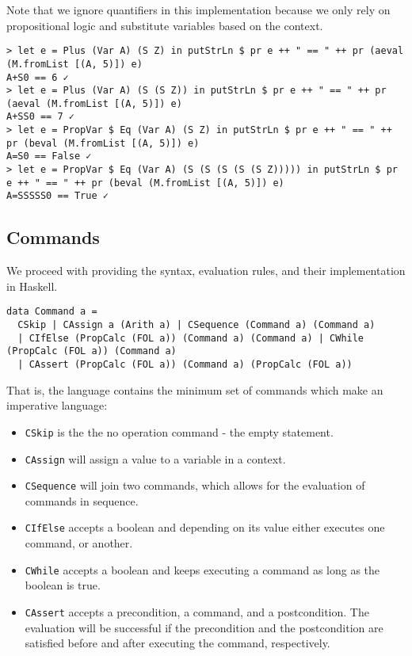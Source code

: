 \documentclass{article}
\begin{document}
Note that we ignore quantifiers in this implementation because we only rely on propositional logic and substitute variables based on the context.

\begin{lstlisting}
> let e = Plus (Var A) (S Z) in putStrLn $ pr e ++ " == " ++ pr (aeval (M.fromList [(A, 5)]) e)
A+S0 == 6 ✓
> let e = Plus (Var A) (S (S Z)) in putStrLn $ pr e ++ " == " ++ pr (aeval (M.fromList [(A, 5)]) e)
A+SS0 == 7 ✓
> let e = PropVar $ Eq (Var A) (S Z) in putStrLn $ pr e ++ " == " ++ pr (beval (M.fromList [(A, 5)]) e)
A=S0 == False ✓
> let e = PropVar $ Eq (Var A) (S (S (S (S (S Z))))) in putStrLn $ pr e ++ " == " ++ pr (beval (M.fromList [(A, 5)]) e)
A=SSSSS0 == True ✓
\end{lstlisting}

\subsection{Commands}

We proceed with providing the syntax, evaluation rules, and their implementation in Haskell.

\begin{lstlisting}
data Command a =
  CSkip | CAssign a (Arith a) | CSequence (Command a) (Command a)
  | CIfElse (PropCalc (FOL a)) (Command a) (Command a) | CWhile (PropCalc (FOL a)) (Command a)
  | CAssert (PropCalc (FOL a)) (Command a) (PropCalc (FOL a))
\end{lstlisting}

That is, the language contains the minimum set of commands which make an imperative language:

\begin{itemize}
\item \texttt{CSkip} is the the no operation command - the empty statement.
\item \texttt{CAssign} will assign a value to a variable in a context.
\item \texttt{CSequence} will join two commands, which allows for the evaluation of commands in sequence.
\item \texttt{CIfElse} accepts a boolean and depending on its value either executes one command, or another.
\item \texttt{CWhile} accepts a boolean and keeps executing a command as long as the boolean is true.
\item \texttt{CAssert} accepts a precondition, a command, and a postcondition. The evaluation will be successful if the precondition and the postcondition are satisfied before and after executing the command, respectively.
\end{itemize}
\end{document}
